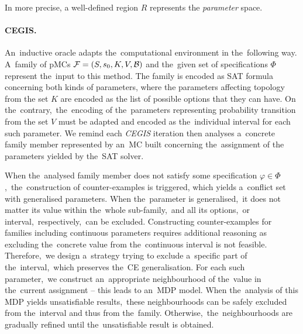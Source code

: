 In more precise, a well-defined region $R$ represents the \textit{parameter} space.

\paragraph{CEGIS.}
An~inductive oracle adapts the~computational environment in the~following way.
A~family of pMCs $\mathcal{F} = (S,s_{0},K, V, \mathcal{B})$ and the~given set of specifications $\varPhi$ represent the~input to this method.
The family is encoded as SAT formula concerning both kinds of parameters, where the parameters affecting topology from the set $K$ are encoded as the list of possible options that they can have.
On the~contrary,~the~encoding of the~parameters representing probability transition from the set $V$ must be adapted and encoded as the~individual interval for each such parameter.
We remind each \textit{CEGIS} iteration then analyses a~concrete family member represented by an~MC built concerning the~assignment of the parameters yielded by the~SAT solver.

When the~analysed family member does not satisfy some specification $\varphi \in \varPhi$,~the~construction of counter-examples is triggered, which yields a~conflict set with generalised parameters.
When the~parameter is generalised,~it does not matter its value within the~whole sub-family,~and all its options,~or interval,~respectively,~can be excluded.
Constructing counter-examples for families including continuous parameters requires additional reasoning as excluding the~concrete value from the~continuous interval is not feasible. 
Therefore,~we design a~strategy trying to exclude a~specific part of the~interval,~which preserves the~CE generalisation. 
For each such parameter,~we construct an~appropriate neighbourhood of the~value in the~current assignment -- this leads to an~MDP model.
When the~analysis of this MDP yields unsatisfiable results,~these neighbourhoods can be safely excluded from the~interval and thus from the~family.
Otherwise,~the~neighbourhoods are gradually refined until the~unsatisfiable result is obtained.

